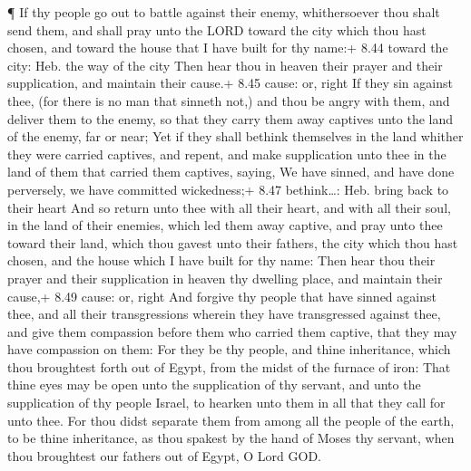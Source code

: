  ¶ If thy people go out to battle against their enemy,
whithersoever thou shalt send them, and shall pray unto the LORD toward
the city which thou hast chosen, and toward the house that I have built
for thy name:+ 8.44 toward the city: Heb. the way of the city
 Then hear thou in heaven their prayer and their
supplication, and maintain their cause.+ 8.45 cause: or, right
 If they sin against thee, (for there is no man that
sinneth not,) and thou be angry with them, and deliver them to the
enemy, so that they carry them away captives unto the land of the enemy,
far or near;  Yet if they shall bethink themselves in the
land whither they were carried captives, and repent, and make
supplication unto thee in the land of them that carried them captives,
saying, We have sinned, and have done perversely, we have committed
wickedness;+ 8.47 bethink\ldots: Heb. bring back to their heart
 And so return unto thee with all their heart, and with all
their soul, in the land of their enemies, which led them away captive,
and pray unto thee toward their land, which thou gavest unto their
fathers, the city which thou hast chosen, and the house which I have
built for thy name:  Then hear thou their prayer and their
supplication in heaven thy dwelling place, and maintain their cause,+
8.49 cause: or, right  And forgive thy people that have
sinned against thee, and all their transgressions wherein they have
transgressed against thee, and give them compassion before them who
carried them captive, that they may have compassion on them:
 For they be thy people, and thine inheritance, which thou
broughtest forth out of Egypt, from the midst of the furnace of iron:
 That thine eyes may be open unto the supplication of thy
servant, and unto the supplication of thy people Israel, to hearken unto
them in all that they call for unto thee.  For thou didst
separate them from among all the people of the earth, to be thine
inheritance, as thou spakest by the hand of Moses thy servant, when thou
broughtest our fathers out of Egypt, O Lord GOD.

